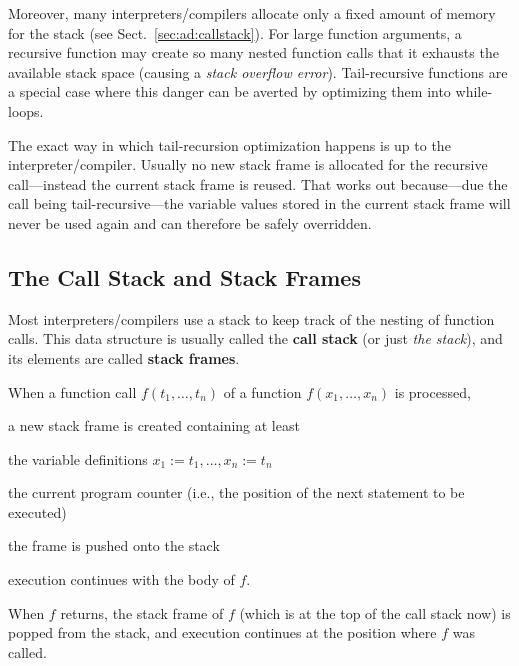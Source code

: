 Moreover, many interpreters/compilers allocate only a fixed amount of memory for the stack (see Sect.~\ref{sec:ad:callstack}).
For large function arguments, a recursive function may create so many nested function calls that it exhausts the available stack space (causing a \emph{stack overflow error}).
Tail-recursive functions are a special case where this danger can be averted by optimizing them into while-loops.

The exact way in which tail-recursion optimization happens is up to the interpreter/compiler.
Usually no new stack frame is allocated for the recursive call---instead the current stack frame is reused.
That works out because---due the call being tail-recursive---the variable values stored in the current stack frame will never be used again and can therefore be safely overridden.

\subsection{The Call Stack and Stack Frames}

Most interpreters/compilers use a stack to keep track of the nesting of function calls.
This data structure is usually called the \textbf{call stack} (or just \emph{the stack}), and its elements are called \textbf{stack frames}.

When a function call $f(t_1,\ldots,t_n)$ of a function $f(x_1,\ldots,x_n)$ is processed,
\begin{compactitem}
 \item a new stack frame is created containing at least
   \begin{compactitem}
     \item the variable definitions $x_1:=t_1, \ldots, x_n:=t_n$
     \item the current program counter (i.e., the position of the next statement to be executed)
   \end{compactitem}
 \item the frame is pushed onto the stack
 \item execution continues with the body of $f$.
\end{compactitem}

When $f$ returns, the stack frame of $f$ (which is at the top of the call stack now) is popped from the stack, and execution continues at the position where $f$ was called.